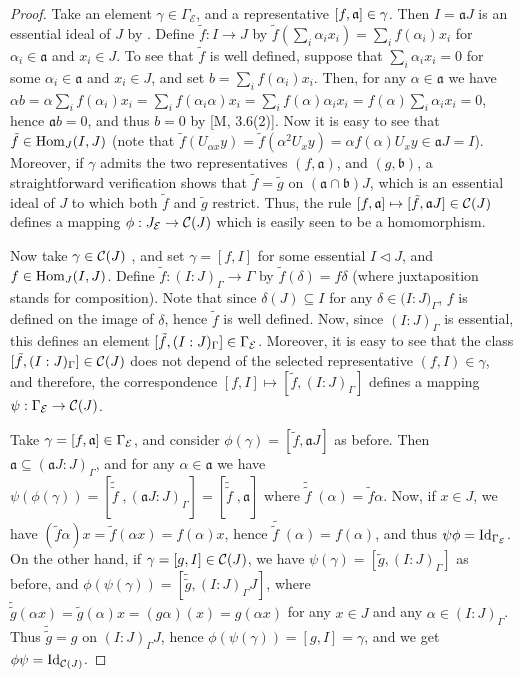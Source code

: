 \documentclass[a4paper,twoside,11pt]{article}
\theoremstyle{plain}
\theoremstyle{miestilo}
\theoremstyle{misnotas}
\begin{document}
\begin{proof} Take an element $\gamma \in \Gamma_{\mathcal E}$, and a representative $[f,\frak a]\in \gamma$. Then $I =\mathfrak
a J$ is an essential ideal of $J$ by \cite[3.7]{densos}. Define $\tilde f: I \rightarrow J$ by
$\tilde f(\sum_i \alpha_i x_i) = \sum_if(\alpha_i)x_i$ for $\alpha_i \in \mathfrak a$ and $x_i\in J$.
To see that $\tilde f$ is well defined, suppose that $\sum_i \alpha_i x_i= 0$ for some
$\alpha_i \in \mathfrak a$ and $x_i\in J$, and set $b = \sum_if(\alpha_i)x_i$. Then, for any
$\alpha \in \mathfrak a$ we have $\alpha b=\alpha \sum_if(\alpha_i)x_i = \sum_if(\alpha_i\alpha)x_i
=\sum_if(\alpha)\alpha_ix_i= f(\alpha)\sum_i\alpha_ix_i= 0$, hence $\mathfrak ab = 0$, and
thus $b = 0$ by [M, 3.6(2)]. Now it is easy to see that $\tilde f \in {\rm Hom}_J(I,J)$ (note
that $\tilde f(U_{\alpha x}y) = \tilde f(\alpha^2U_xy)= \alpha f(\alpha)U_xy\in \mathfrak aJ=I$).
Moreover, if $\gamma$ admits the two representatives $(f,\mathfrak a)$, and $(g,\mathfrak b)$, a straightforward verification shows that
$\tilde f = \tilde g$ on $(\mathfrak a\cap \mathfrak b)J$, which is an essential ideal of $J$ to which
both $\tilde f$ and $\tilde g$ restrict. Thus, the rule $[f,\mathfrak a] \mapsto [\tilde f, \mathfrak
aJ]\in \mathcal C(J)$ defines a mapping $\phi:J_\mathcal E\rightarrow \mathcal C(J)$ which is easily seen to be a
homomorphism.

Now take $\gamma  \in \mathcal C(J)$ , and set $\gamma = [f,I]$ for some essential $I\triangleleft J$, and $f
\in {\rm Hom}_J(I,J)$. Define $\tilde f: (I:J)_\Gamma\rightarrow \Gamma$ by $\tilde
f(\delta)= f\delta$ (where juxtaposition stands for composition). Note that since $\delta(J)\subseteq I$ for any
$\delta \in \mathfrak (I:J)_\Gamma$, $f$ is defined on the image of $\delta$, hence $\tilde f$ is well defined. Now, since $(I:J)_\Gamma$
is essential, this defines an element $[\tilde f, (I:J)_\Gamma]\in \Gamma_\mathcal E$. Moreover, it
is easy to see that the class $[\tilde f, (I:J)_\Gamma]\in \mathcal C(J)$ does not depend of the
selected representative $(f,I)\in \gamma$, and therefore, the correspondence $[f,I]\mapsto
[\tilde f, (I:J)_\Gamma]$ defines a mapping $\psi: \Gamma_\mathcal E\rightarrow \mathcal C(J)$.

Take $\gamma =[f,\mathfrak a] \in \Gamma_\mathcal E$, and consider $\phi(\gamma) = [\tilde f,{ \mathfrak a} J]$
as before. Then $\mathfrak a \subseteq ({\mathfrak a}J:J)_\Gamma$, and for any $\alpha \in{ \mathfrak a}$ we have
$\psi(\phi(\gamma)) = [\tilde{\tilde f}\;,({\mathfrak a}J:J)_\Gamma] = [\tilde{\tilde f}\;,\mathfrak a]$
where $\tilde{\tilde f}\;(\alpha) = \tilde f\alpha$. Now, if
$x\in J$, we have $(\tilde f\alpha) x = \tilde f(\alpha x) = f(\alpha)x$, hence
$\tilde{\tilde f\;}(\alpha) = f(\alpha)$, and thus $\psi\phi = {\rm Id}_{\Gamma_\mathcal E}$. On
the other hand, if $\gamma = [g, I] \in \mathcal C(J)$, we have $\psi(\gamma) = [\tilde g,
(I:J)_\Gamma]$ as before, and $\phi(\psi(\gamma)) = [\tilde{\tilde g},(I:J)_\Gamma J]$,
where $\tilde{\tilde g}(\alpha x) = \tilde g(\alpha)x = (g\alpha)(x) = g(\alpha x)$ for any
$x\in J$ and any $\alpha \in (I:J)_\Gamma$. Thus $\tilde{\tilde g} = g$ on $(I:J)_\Gamma
J$, hence $\phi(\psi(\gamma)) = [g, I] =\gamma$, and we get $\phi\psi= {\rm
Id}_{\mathcal C(J)}$.\end{proof}
\end{document}

